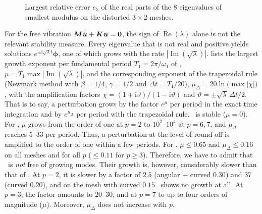 \begin{figure}[htbp]
  \centering
  
  \caption{Largest relative error $e_{\uplambda}$ of the real parts of the 8 eigenvalues of smallest modulus on the distorted $3\times2$ meshes.}
  \label{fig:spectrum}
\end{figure}

For the free vibration $\bm{M}\ddot{\bm{u}}+\bm{K}\bm{u}=\bm{0}$, the sign of $\operatorname{Re}(\lambda)$ alone is not the relevant stability measure. Every eigenvalue that is not real and positive yields solutions $e^{\pm\mathrm i\sqrt\lambda t}\bm\phi$, one of which grows with the rate $|\operatorname{Im}(\sqrt\lambda)|$.  lists the largest growth exponent per fundamental period $T_1=2\pi/\omega_1$ of \PP, $\mu=T_1\max|\operatorname{Im}(\sqrt\lambda)|$, and the corresponding exponent of the trapezoidal rule (Newmark method with $\beta=1/4$, $\gamma=1/2$ and $\Delta t=T_1/20$), $\mu_\Delta=20\ln\bigl(\max|\chi|\bigr)$, with the amplification factors $\chi=(1+\mathrm i\vartheta)/(1-\mathrm i\vartheta)$ and $\vartheta=\pm\sqrt\lambda\,\Delta t/2$. That is to say, a perturbation grows by the factor $e^{\mu}$ per period in the exact time integration and by $e^{\mu_\Delta}$ per period with the trapezoidal rule. \PP\ is stable ($\mu=0$). For \PM, $\mu$ grows from the order of one at $p=2$ to $10^{2}$--$10^{4}$ at $p=6,7$, and $\mu_\Delta$ reaches $5$--$33$ per period. Thus, a perturbation at the level of round-off is amplified to the order of one within a few periods. For \PH, $\mu\le0.65$ and $\mu_\Delta\le0.16$ on all meshes and for all $p$ ($\le0.11$ for $p\ge3$). Therefore, we have to admit that \PH\ is \emph{not} free of growing modes. Their growth is, however, considerably slower than that of \PM. At $p=2$, it is slower by a factor of $2.5$ (angular + curved $0.30$) and $37$ (curved $0.20$), and on the mesh with curved $0.15$ \PH\ shows no growth at all. At $p=3$, the factor amounts to $20$--$30$, and at $p=7$ to up to four orders of magnitude ($\mu$). Moreover, $\mu_\Delta$ does not increase with $p$.

\begin{table}[htbp]
  \centering\small
  \caption{Largest growth exponent per fundamental period of the semi-discrete free vibration ($\mu$) and of the trapezoidal rule with $\Delta t=T_1/20$ ($\mu_\Delta$) on the distorted $3\times2$ meshes. \PP: $\mu=0$ and $\mu_\Delta<10^{-14}$ in all cases.}
  \label{tab:growth}
  
\end{table}

